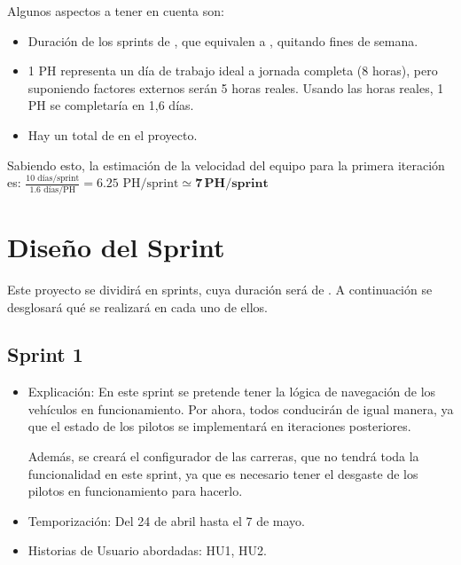 \bigskip

Algunos aspectos a tener en cuenta son:

\begin{itemize}
    \item Duración de los sprints de \sprintLength, que equivalen a \actualSprintLength, quitando fines de semana.
    \item 1 PH representa un día de trabajo ideal a jornada completa (8 horas), pero suponiendo factores externos serán 5 
    horas reales. Usando las horas reales, 1 PH se completaría en 1,6 días.
    \item Hay un total de \projectph en el proyecto.
\end{itemize}

\bigskip

Sabiendo esto, la estimación de la velocidad del equipo para la primera iteración es: $\frac{10 \text{ días/sprint}}{1.6 \text{ días/PH}} = 6.25 \text{ PH/sprint} \simeq \mathbf{7\,PH/sprint}$

\section{Diseño del Sprint}

Este proyecto se dividirá en \sprintNro sprints, cuya duración será de \sprintLength. A continuación se desglosará qué se realizará en cada uno de ellos.

\subsection{Sprint 1}
\begin{itemize}
    \item Explicación: En este sprint se pretende tener la lógica de navegación de los vehículos en funcionamiento. Por ahora, todos conducirán de igual manera, ya que el estado de los pilotos se implementará en iteraciones posteriores.
    
    Además, se creará el configurador de las carreras, que no tendrá toda la funcionalidad en este sprint, ya que es necesario tener el desgaste de los pilotos en funcionamiento para hacerlo.

    \item Temporización: Del 24 de abril hasta el 7 de mayo.
    \item Historias de Usuario abordadas: HU1, HU2.
\end{itemize}

